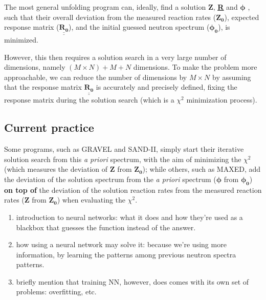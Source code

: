 \documentclass[a4paper, 12pt]{article}
\newcommand{\matr}[1]{\underline{\underline{\textbf{#1}}}}
\newcommand{\ve}[1]{\boldsymbol{#1}}
\begin{document}
The most general unfolding program can, ideally, find a solution $\ve{Z}$, \matr{R} and $\ve{\phi}$ \cite{theorypdf}, such that their overall deviation from the measured reaction rates ($\ve{Z_0}$), expected response matrix ($\underline{\underline{\mathbf{R_0}}}$), and the initial guessed neutron spectrum ($\ve{\phi_0}$), is minimized.

However, this then requires a solution search in a very large number of dimensions, namely $(M\times N)+M+N$ dimensions. To make the problem more approachable, we can reduce the number of dimensions by $M\times N$ by assuming that the response matrix $\underline{\underline{\mathbf{R_0}}}$ is accurately and precisely defined, fixing the response matrix during the solution search (which is a $\chi^2$ minimization process).

\subsection{Current practice}
Some programs, such as GRAVEL and SAND-II, simply start their iterative solution search from this \emph{a priori} spectrum, with the aim of minimizing the $\chi^2$ (which measures the deviation of $\ve{Z}$ from $\ve{Z_0}$); while others, such as MAXED, add the deviation of the solution spectrum from the \emph{a priori} spectrum ($\ve{\phi}$ from $\ve{\phi_0}$) \textbf{on top of} the deviation of the solution reaction rates from the measured reaction rates ($\ve{Z}$ from $\ve{Z_0}$) when evaluating the $\chi^2$.

\begin{enumerate}
    \item introduction to neural networks: what it does and how they're used as a blackbox that guesses the function instead of the answer.
    \item how using a neural network may solve it: because we're using more information, by learning the patterns among previous neutron spectra patterns.
    \item briefly mention that training NN, however, does comes with its own set of problems: overfitting, etc.
\end{enumerate}
\end{document}
